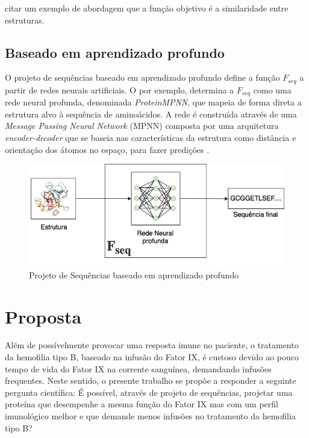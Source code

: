 {\color{red} citar um exemplo de abordagem que a função objetivo é a similaridade entre estruturas. }


\subsection{Baseado em aprendizado profundo}

O projeto de sequências baseado em aprendizado profundo define a função $F_{seq}$ 
a partir de redes neurais artificiais. 
O \cite{ProteinMPNN} por exemplo, 
determina a $F_{seq}$ como uma rede neural profunda, denominada \textit{ProteinMPNN}, 
que mapeia de forma direta a estrutura alvo à sequência de aminoácidos. 
A rede é construída através de uma \textit{Message Passing Neural Network} (MPNN) 
composta por uma arquitetura \textit{encoder-decoder} 
que se baseia nas características da estrutura como distância e orientação dos átomos no espaço, 
para fazer predições \cite{ProteinMPNN}. 

\begin{figure}[H]
  \centering
  \includegraphics[width=.8\textwidth]{figuras/metodologia-DeepLearningBased.jpg}
  \caption{Projeto de Sequências baseado em aprendizado profundo} 
\end{figure}


\section{Proposta} 
\label{section:Proposta}
Além de possívelmente provocar uma resposta imune no paciente, 
o tratamento da hemofilia tipo B, baseado na infusão do Fator IX, 
é custoso devido ao pouco tempo de vida do Fator IX na corrente sanguínea, demandando infusões frequentes. 
Neste sentido, o presente trabalho se propõe a responder a seguinte pergunta científica: 
É possível, através de projeto de sequências, projetar uma proteína que desempenhe a mesma função do Fator IX mas com 
um perfil imunológico melhor e que demande menos infusões no tratamento da hemofilia tipo B?

